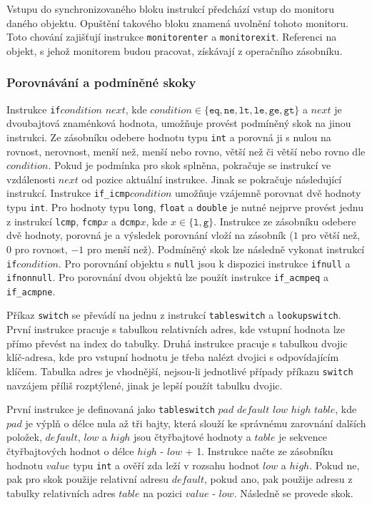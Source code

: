 Vstupu do synchronizovaného bloku instrukcí předchází vstup do monitoru daného objektu. Opuštění takového bloku znamená uvolnění tohoto monitoru. Toto chování zajišťují instrukce \texttt{monitorenter} a \texttt{monitorexit}. Referenci na objekt, s jehož monitorem budou pracovat, získávají z operačního zásobníku.

\subsubsection{Porovnávání a podmíněné skoky}

Instrukce \texttt{if}$condition$ $next$, kde $condition \in \{ \texttt{eq}, \texttt{ne}, \texttt{lt}, \texttt{le}, \texttt{ge}, \texttt{gt}\}$ a $next$ je dvoubajtová znaménková hodnota, umožňuje provést podmíněný skok na jinou instrukci. Ze zásobníku odebere hodnotu typu \texttt{int} a porovná ji s nulou na rovnost, nerovnost, menší než, menší nebo rovno, větší než či větší nebo rovno dle $condition$. Pokud je podmínka pro skok splněna, pokračuje se instrukcí ve vzdálenosti $next$ od pozice aktuální instrukce. Jinak se pokračuje následující instrukcí. Instrukce \texttt{if\_icmp}$condition$ umožňuje vzájemně porovnat dvě hodnoty typu \texttt{int}.
 Pro hodnoty typu \texttt{long}, \texttt{float} a \texttt{double} je nutné nejprve provést jednu z instrukcí \texttt{lcmp}, \texttt{fcmp}$x$ a \texttt{dcmp}$x$, kde $x \in \{\texttt{l}, \texttt{g} \}$. Instrukce ze zásobníku odebere dvě hodnoty, porovná je a výsledek porovnání vloží na zásobník ($1$ pro větší než, $0$ pro rovnost, $-1$ pro menší než). Podmíněný skok lze následně vykonat instrukcí \texttt{if}$condition$.
Pro porovnání objektu s \texttt{null} jsou k dispozici instrukce \texttt{ifnull} a \texttt{ifnonnull}. Pro porovnání dvou objektů lze použít instrukce \texttt{if\_acmpeq} a \texttt{if\_acmpne}.

Příkaz \texttt{switch} se převádí na jednu z instrukcí \texttt{tableswitch} a \texttt{lookupswitch}. První instrukce pracuje s tabulkou relativních adres, kde vstupní hodnota lze přímo převést na index do tabulky. Druhá instrukce pracuje s tabulkou dvojic klíč-adresa, kde pro vstupní hodnotu je třeba nalézt dvojici s odpovídajícím klíčem. Tabulka adres je vhodnější, nejsou-li jednotlivé případy příkazu \texttt{switch} navzájem příliš rozptýlené, jinak je lepší použít tabulku dvojic.

První instrukce je definovaná jako \texttt{tableswitch} $pad$ $default$ $low$ $high$ $table$, kde $pad$ je výplň o délce nula až tři bajty, která slouží ke správnému zarovnání dalších položek, $default$, $low$ a $high$ jsou čtyřbajtové hodnoty a $table$ je sekvence čtyřbajtových hodnot o délce $high$ - $low$ + 1. Instrukce načte ze zásobníku hodnotu $value$ typu \texttt{int} a ověří zda leží v rozsahu hodnot $low$ a $high$. Pokud ne, pak pro skok použije relativní adresu $default$, pokud ano, pak použije adresu z tabulky relativních adres $table$ na pozici $value$ - $low$. Následně se provede skok.

